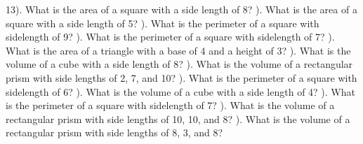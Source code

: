 \documentclass{article}%
\begin{document}
13). What is the area of a square with a side length of 8?%
\newline%
\newline%
). What is the area of a square with a side length of 5?%
\newline%
\newline%
). What is the perimeter of a square with sidelength of 9?%
\newline%
\newline%
). What is the perimeter of a square with sidelength of 7?%
\newline%
\newline%
). What is the area of a triangle with a base of 4 and a height of 3?%
\newline%
\newline%
). What is the volume of a cube with a side length of 8?%
\newline%
\newline%
). What is the volume of a rectangular prism with side lengths of 2, 7, and 10?%
\newline%
\newline%
). What is the perimeter of a square with sidelength of 6?%
\newline%
\newline%
). What is the volume of a cube with a side length of 4?%
\newline%
\newline%
). What is the perimeter of a square with sidelength of 7?%
\newline%
\newline%
). What is the volume of a rectangular prism with side lengths of 10, 10, and 8?%
\newline%
\newline%
). What is the volume of a rectangular prism with side lengths of 8, 3, and 8?%
\newline%
\newline%
\newline%
\end{document}
